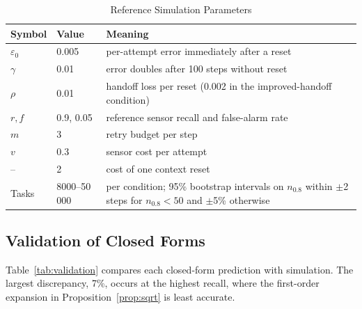 \documentclass[journal]{IEEEtran}
\begin{document}
\begin{table}[!t]
\centering
\caption{Reference Simulation Parameters}
\label{tab:params}
\footnotesize
\begin{tabularx}{\columnwidth}{@{}llX@{}}
\toprule
Symbol & Value & Meaning\\
\midrule
$\varepsilon_0$ & 0.005 & per-attempt error immediately after a reset\\
$\gamma$ & 0.01 & error doubles after 100 steps without reset\\
$\rho$ & 0.01 & handoff loss per reset (0.002 in the improved-handoff condition)\\
$r,f$ & 0.9, 0.05 & reference sensor recall and false-alarm rate\\
$m$ & 3 & retry budget per step\\
$v$ & 0.3 & sensor cost per attempt\\
-- & 2 & cost of one context reset\\
Tasks & 8000--50\,000 & per condition; 95\% bootstrap intervals on $n_{0.8}$ within $\pm$2 steps for $n_{0.8}<50$ and $\pm$5\% otherwise\\
\bottomrule
\end{tabularx}
\end{table}

\subsection{Validation of Closed Forms}
Table~\ref{tab:validation} compares each closed-form prediction with simulation. The largest discrepancy, 7\%, occurs at the highest recall, where the first-order expansion in Proposition~\ref{prop:sqrt} is least accurate.
\end{document}
